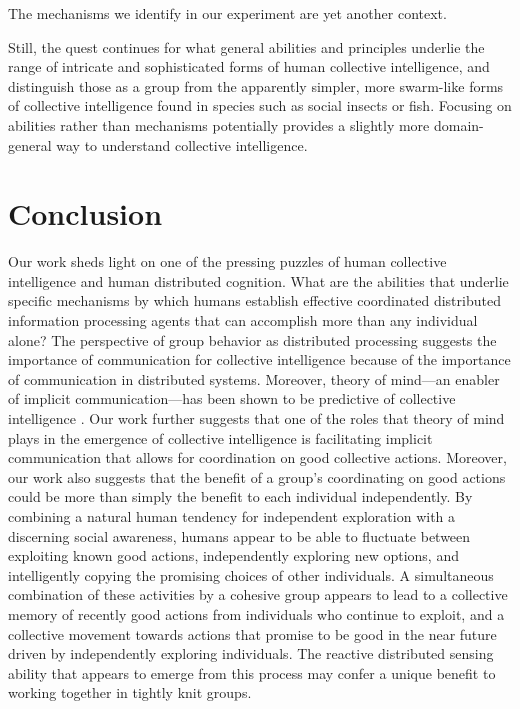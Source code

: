 \documentclass[12pt,letterpaper]{article}
\begin{document}
The mechanisms we identify in our experiment are yet another context.

Still, the quest continues for what general abilities and principles underlie the range of intricate and sophisticated forms of human collective intelligence, and distinguish those as a group from the apparently simpler, more swarm-like forms of collective intelligence found in species such as social insects or fish.  Focusing on abilities rather than mechanisms potentially provides a slightly more domain-general way to understand collective intelligence.

\section{Conclusion}

Our work sheds light on one of the pressing puzzles of
human collective intelligence and human distributed cognition.  What
are the abilities that underlie specific mechanisms by which humans establish effective
coordinated distributed information processing agents that can
accomplish more than any individual alone?  The perspective of group behavior as
distributed processing \cite{hutchins_cognition_1995} suggests the
importance of communication for collective intelligence because of the
importance of communication in distributed systems.  Moreover, theory
of mind---an enabler of implicit communication---has been shown to be
predictive of collective intelligence \cite{woolley_evidence_2010,
  engel_reading_2014}.  Our work further
suggests that one of the roles that theory of mind plays in the
emergence of collective intelligence is facilitating implicit
communication that allows for coordination on good collective actions.
Moreover, our work also suggests that the benefit of a group's
coordinating on good actions could be more than simply the benefit to
each individual independently.  By combining a natural human tendency
for independent exploration with a discerning social awareness, humans
appear to be able to fluctuate between exploiting known good actions,
independently exploring new options, and intelligently copying the
promising choices of other individuals.  A simultaneous combination of
these activities by a cohesive group appears to lead to a collective
memory of recently good actions from individuals who continue to
exploit, and a collective movement towards actions that promise to be
good in the near future driven by independently exploring individuals.
The reactive distributed sensing ability that appears to emerge from
this process may confer a unique benefit to working together in
tightly knit groups.
\end{document}
